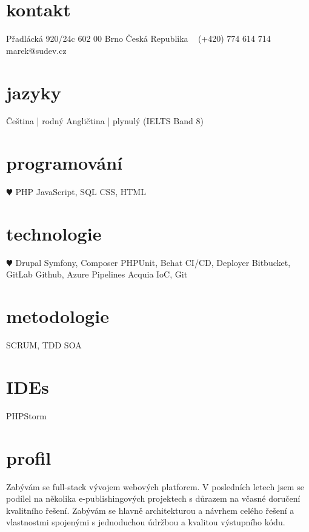 \documentclass[]{friggeri-cv} %
\begin{document}


\begin{aside} %
\section{kontakt}
Přadlácká 920/24c
602 00 Brno
Česká Republika
~
(+420) 774 614 714
~
marek@sudev.cz
\section{jazyky}
Čeština | rodný
Angličtina | plynulý
(IELTS Band 8)
\section{programování}
{\color{red} $\varheartsuit$} PHP
JavaScript, SQL
CSS, HTML
\section{technologie}
{\color{red} $\varheartsuit$} Drupal
Symfony, Composer
PHPUnit, Behat
CI/CD, Deployer
Bitbucket, GitLab
Github, Azure Pipelines
Acquia
IoC, Git
\section{metodologie}
SCRUM, TDD
SOA
\section{IDEs}
PHPStorm
\end{aside}

\section{profil}
Zabývám se full-stack vývojem webových platforem.
V posledních letech jsem se podílel na několika e-publishingových projektech s důrazem na včasné doručení kvalitního řešení.
Zabývám se hlavně architekturou a návrhem celého řešení a vlastnostmi spojenými s jednoduchou údržbou a kvalitou výstupního kódu.
\end{document}

